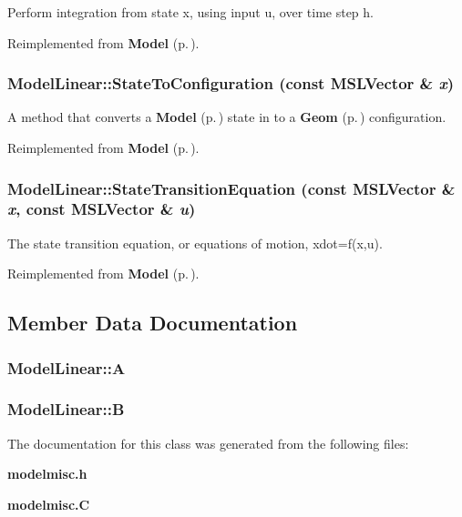 Perform integration from state x, using input u, over time step h.



Reimplemented from {\bf Model} {\rm (p.\,\pageref{classModel_a5})}.
\subsubsection{ Model\-Linear::State\-To\-Configuration (const {\bf MSLVector} \& {\em x})\hspace{0.3cm}{\tt  [virtual]}}\label{classModelLinear_a2}


A method that converts a {\bf Model} {\rm (p.\,\pageref{classModel})} state in to a {\bf Geom} {\rm (p.\,\pageref{classGeom})} configuration.



Reimplemented from {\bf Model} {\rm (p.\,\pageref{classModel_a8})}.
\subsubsection{ Model\-Linear::State\-Transition\-Equation (const {\bf MSLVector} \& {\em x}, const {\bf MSLVector} \& {\em u})\hspace{0.3cm}{\tt  [virtual]}}\label{classModelLinear_a4}


The state transition equation, or equations of motion, xdot=f(x,u).



Reimplemented from {\bf Model} {\rm (p.\,\pageref{classModel_a3})}.

\subsection{Member Data Documentation}
\subsubsection{ Model\-Linear::A}\label{classModelLinear_m0}


\subsubsection{ Model\-Linear::B}\label{classModelLinear_m1}




The documentation for this class was generated from the following files:\begin{CompactItemize}
\item 
{\bf modelmisc.h}\item 
{\bf modelmisc.C}\end{CompactItemize}
